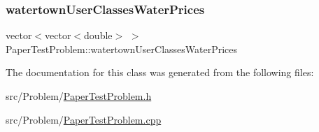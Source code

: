 \subsubsection{\texorpdfstring{watertown\+User\+Classes\+Water\+Prices}{watertownUserClassesWaterPrices}}
{\footnotesize\ttfamily vector$<$vector$<$double$>$ $>$ Paper\+Test\+Problem\+::watertown\+User\+Classes\+Water\+Prices\hspace{0.3cm}{\ttfamily [private]}}



The documentation for this class was generated from the following files\+:\begin{DoxyCompactItemize}
\item 
src/\+Problem/\mbox{\hyperlink{PaperTestProblem_8h}{Paper\+Test\+Problem.\+h}}\item 
src/\+Problem/\mbox{\hyperlink{PaperTestProblem_8cpp}{Paper\+Test\+Problem.\+cpp}}\end{DoxyCompactItemize}
